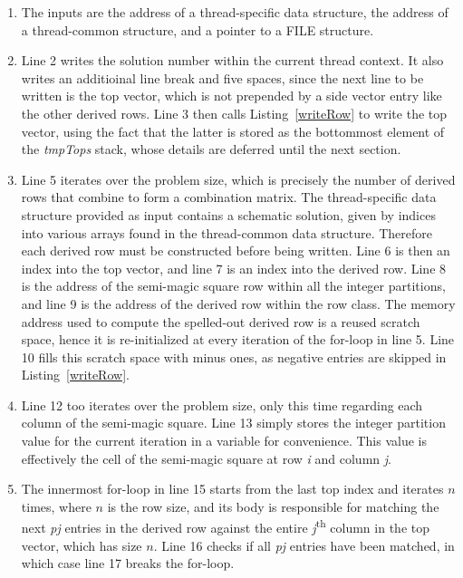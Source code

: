 \begin{enumerate}
\item The inputs are the address of a thread-specific data structure, the address of a thread-common structure, and a pointer to a FILE structure.
\item Line 2 writes the solution number within the current thread context. It also writes an additioinal line break and five spaces, since the next line to be written is the top vector, which is not prepended by a side vector entry like the other derived rows. Line 3 then calls Listing~\ref{writeRow} to write the top vector, using the fact that the latter is stored as the bottommost element of the \emph{tmpTops} stack, whose details are deferred until the next section. 
\addtocounter{enumi}{2}
\item Line 5 iterates over the problem size, which is precisely the number of derived rows that combine to form a combination matrix. The thread-specific data structure provided as input contains a schematic solution, given by indices into various arrays found in the thread-common data structure. Therefore each derived row must be constructed before being written. Line 6 is then an index into the top vector, and line 7 is an index into the derived row. Line 8 is the address of the semi-magic square row within all the integer partitions, and line 9 is the address of the derived row within the row class. The memory address used to compute the spelled-out derived row is a reused scratch space, hence it is re-initialized at every iteration of the for-loop in line 5. Line 10 fills this scratch space with minus ones, as negative entries are skipped in Listing~\ref{writeRow}.
\addtocounter{enumi}{6}
\item Line 12 too iterates over the problem size, only this time regarding each column of the semi-magic square. Line 13 simply stores the integer partition value for the current iteration in a variable for convenience. This value is effectively the cell of the semi-magic square at row \emph{i} and column \emph{j}.
\addtocounter{enumi}{2}
\item The innermost for-loop in line 15 starts from the last top index and iterates $n$ times, where $n$ is the row size, and its body is responsible for matching the next \emph{pj} entries in the derived row against the entire \emph{j}\textsuperscript{th} column in the top vector, which has size $n$. Line 16 checks if all \emph{pj} entries have been matched, in which case line 17 breaks the for-loop.

\end{enumerate}
